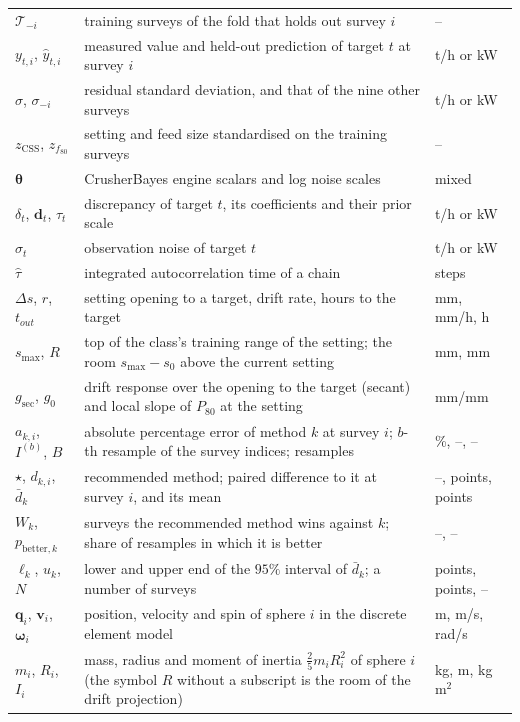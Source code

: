 \begin{longtable}{@{}p{} p{} p{}@{}}
$\mathcal T_{-i}$ & training surveys of the fold that holds out survey $i$ & -- \\
$y_{t,i}$, $\hat y_{t,i}$ & measured value and held-out prediction of target $t$ at survey $i$ & t/h or kW \\
$\sigma$, $\sigma_{-i}$ & residual standard deviation, and that of the nine other surveys & t/h or kW \\
$z_{\mathrm{CSS}}$, $z_{f_{80}}$ & setting and feed size standardised on the training surveys & -- \\
$\boldsymbol\theta$ & CrusherBayes engine scalars and log noise scales & mixed \\
$\delta_t$, $\mathbf d_t$, $\tau_t$ & discrepancy of target $t$, its coefficients and their prior scale & t/h or kW \\
$\sigma_t$ & observation noise of target $t$ & t/h or kW \\
$\hat\tau$ & integrated autocorrelation time of a chain & steps \\
$\Delta s$, $r$, $t_{out}$ & setting opening to a target, drift rate, hours to the target & mm, mm/h, h \\
$s_{\max}$, $R$ & top of the class's training range of the setting; the room $s_{\max}-s_0$ above the current setting & mm, mm \\
$g_{\mathrm{sec}}$, $g_0$ & drift response over the opening to the target (secant) and local slope of $P_{80}$ at the setting & mm/mm \\
$a_{k,i}$, $I^{(b)}$, $B$ & absolute percentage error of method $k$ at survey $i$; $b$-th resample of the survey indices; resamples & \%, --, -- \\
$\star$, $d_{k,i}$, $\bar d_k$ & recommended method; paired difference to it at survey $i$, and its mean & --, points, points \\
$W_k$, $p_{\mathrm{better},k}$ & surveys the recommended method wins against $k$; share of resamples in which it is better & --, -- \\
$\ell_k$, $u_k$, $N$ & lower and upper end of the $95\%$ interval of $\bar d_k$; a number of surveys & points, points, -- \\
$\mathbf q_i$, $\mathbf v_i$, $\boldsymbol\omega_i$ & position, velocity and spin of sphere $i$ in the discrete element model & m, m/s, rad/s \\
$m_i$, $R_i$, $I_i$ & mass, radius and moment of inertia $\tfrac25m_iR_i^2$ of sphere $i$ (the symbol $R$ without a subscript is the room of the drift projection) & kg, m, kg\,m$^2$ \\

\end{longtable}
